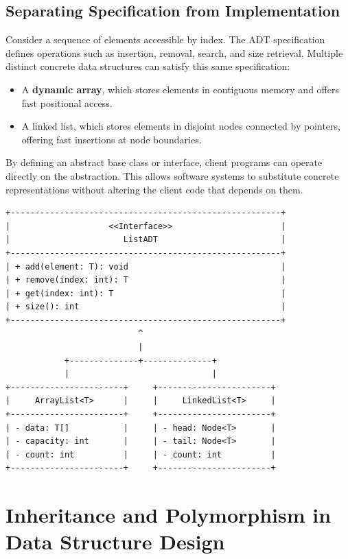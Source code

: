 \documentclass[12pt]{report}
\begin{document}
\subsection{Separating Specification from Implementation}

Consider a sequence of elements accessible by index. The ADT specification defines operations such as insertion, removal, search, and size retrieval. Multiple distinct concrete data structures can satisfy this same specification:

\begin{itemize}
    \item A \textbf{dynamic array}, which stores elements in contiguous memory and offers fast positional access.
    \item A linked list, which stores elements in disjoint nodes connected by pointers, offering fast insertions at node boundaries.
\end{itemize}

By defining an abstract base class or interface, client programs can operate directly on the abstraction. This allows software systems to substitute concrete representations without altering the client code that depends on them.

\begin{verbatim}
+-------------------------------------------------------+
|                    <<Interface>>                      |
|                       ListADT                         |
+-------------------------------------------------------+
| + add(element: T): void                               |
| + remove(index: int): T                               |
| + get(index: int): T                                  |
| + size(): int                                         |
+-------------------------------------------------------+
                           ^
                           |
            +--------------+--------------+
            |                             |
+-----------------------+     +-----------------------+
|     ArrayList<T>      |     |     LinkedList<T>     |
+-----------------------+     +-----------------------+
| - data: T[]           |     | - head: Node<T>       |
| - capacity: int       |     | - tail: Node<T>       |
| - count: int          |     | - count: int          |
+-----------------------+     +-----------------------+
\end{verbatim}

\section{Inheritance and Polymorphism in Data Structure Design}
\end{document}
